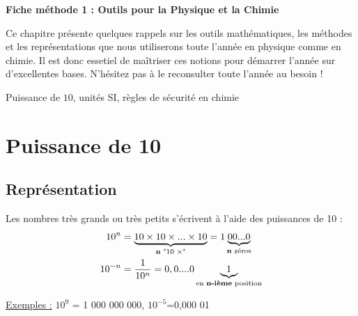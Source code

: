 \newpage

\renewcommand{\thesubsection}{\textcolor{red}{\Roman{section}.\arabic{subsection}}}
\renewcommand{\thesubsubsection}{\textcolor{red}{\Roman{section}.\arabic{subsection}.\alph{subsubsection}}}

\setcounter{section}{0}
\sndEnTeteMethodoUn

\begin{center}
\begin{mdframed}[style=titr, leftmargin=60pt, rightmargin=60pt, innertopmargin=7pt, innerbottommargin=7pt, innerrightmargin=8pt, innerleftmargin=8pt]

\begin{center}
\large{\textbf{Fiche méthode 1 : Outils pour la Physique et la Chimie}}
\end{center}

\end{mdframed}
\end{center}
Ce chapitre présente quelques rappels sur les outils mathématiques, les méthodes et les représentations que nous utiliserons toute l'année en physique comme en chimie. Il est donc essetiel de maîtriser ces notions pour démarrer l'année sur d'excellentes bases. N'hésitez pas à le reconsulter toute l'année au besoin !

\begin{tcolorbox}[colback=blue!5!white,colframe=blue!75!black,title=Mots clés du chapitre :]
Puissance de $10$, unités SI, règles de sécurité en chimie
\end{tcolorbox}

\section{Puissance de 10}
\subsection{Représentation}
Les nombres très grands ou très petits s'écrivent à l'aide des puissances de 10 :
\begin{align*}
    10^n &= \underbrace{10\times10\times ... \times 10}_{\text{\textbf{n} "10 $\times$"}} = 1\underbrace{00...0}_{\text{\textbf{n} zéros}} \\
    10^{-n} &= \frac{1}{10^n} = 0,0....0\underbrace{1}_{\text{en \textbf{n-ième} position}}
\end{align*}

\underline{Exemples :} $10^9$ = 1 000 000 000,    $10^{-5}$=0,000 01\\

